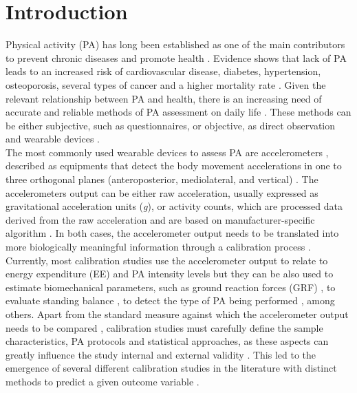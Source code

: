 \documentclass[11pt]{article}
\begin{document}
\section*{Introduction}

Physical activity (PA) has long been established as one of the main contributors to prevent chronic diseases and promote health \cite{Kaminsky_2014, Warburton_2017}. Evidence shows that lack of PA leads to an increased risk of cardiovascular disease, diabetes, hypertension, osteoporosis, several types of cancer and a higher mortality rate \cite{Guthold_2018, Lee_2012, Shiroma_2014}. Given the relevant relationship between PA and health, there is an increasing need of accurate and reliable methods of PA assessment on daily life \cite{Montoye_2000, Plasqui_2013, Strath_2013}. These methods can be either subjective, such as questionnaires, or objective, as direct observation and wearable devices \cite{Strath_2013, Troiano_2005}. \\

The most commonly used wearable devices to assess PA are accelerometers \cite{Strath_2013}, described as equipments that detect the body movement accelerations in one to three orthogonal planes (anteroposterior, mediolateral, and vertical) \cite{Chen_2005}. The accelerometers output can be either raw acceleration, usually expressed as gravitational acceleration units (\textit{g}), or activity counts, which are processed data derived from the raw acceleration and are based on manufacturer-specific algorithm \cite{Chen_2005, Basset_2012, Troiano_2014}. In both cases, the accelerometer output needs to be translated into more biologically meaningful information through a calibration process \cite{Matthews_2005}. \\

Currently, most calibration studies use the accelerometer output to relate to energy expenditure (EE) and PA intensity levels \cite{Migueles_2017, Mendes_2018} but they can be also used to estimate biomechanical parameters, such as ground reaction forces (GRF) \cite{Neugebauer_2014, Fortune_2014}, to evaluate standing balance \cite{Mayagoitia_2002}, to detect the type of PA being performed \cite{Bonomi_2009, Zhang_2012}, among others. Apart from the standard measure against which the accelerometer output needs to be compared	, calibration studies must carefully define the sample characteristics, PA protocols and statistical approaches, as these aspects can greatly influence the study internal and external validity \cite{Basset_2012, Welk_2005}. This led to the emergence of several different calibration studies in the literature with distinct methods to predict a given outcome variable \cite{Mendes_2018, Matthews_2018}. \\
\end{document}
